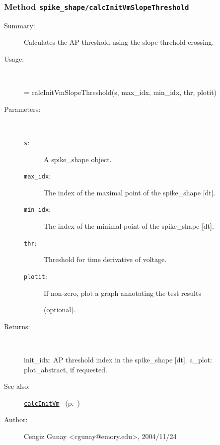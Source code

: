 \subsubsection[Method \texttt{calcInitVmSlopeThreshold}]{Method \texttt{spike\_shape/calcInitVmSlopeThreshold}}%
%
\label{ref_spike_shape__calcInitVmSlopeThreshold}%
\hypertarget{ref_spike_shape__calcInitVmSlopeThreshold}{}%
\begin{description}
\item[Summary:]Calculates the AP threshold using the slope threhold crossing.
%
\item[Usage:]~%
\begin{lyxcode}%
[init\_idx, a\_plot] = calcInitVmSlopeThreshold(s, max\_idx, min\_idx, thr, plotit)
%
\end{lyxcode}%
%
%
\item[Parameters:]~
\begin{description}%
\item[\texttt{s}:]
 A spike\_shape object.
\item[\texttt{max\_idx}:]
 The index of the maximal point of the spike\_shape [dt].
\item[\texttt{min\_idx}:]
 The index of the minimal point of the spike\_shape [dt].
\item[\texttt{thr}:]
 Threshold for time derivative of voltage.
\item[\texttt{plotit}:]
 If non-zero, plot a graph annotating the test results 

(optional).
\end{description}%
%
\item[Returns:
]~

	init\_idx: AP threshold index in the spike\_shape [dt].
	a\_plot: plot\_abstract, if requested.
%
%
\item[See also:]%
\hyperlink{ref_calcInitVm}{\texttt{calcInitVm}}%
\ (p.~\pageref{ref_calcInitVm})%
%
%
\item[Author:]%
Cengiz Gunay <cgunay@emory.edu>, 2004/11/24
%
\end{description}
\methodline%
